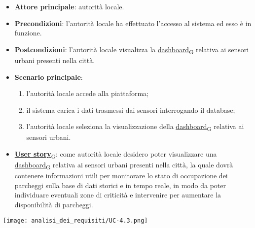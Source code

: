 \begin{itemize}
	\item \textbf{Attore principale}: autorità locale.
	\item \textbf{Precondizioni}: l'autorità locale ha effettuato l'accesso al sistema ed esso è in funzione.
	\item \textbf{Postcondizioni}: l'autorità locale visualizza la \href{https://7last.github.io/docs/pb/documentazione-interna/glossario\#dashboard}{dashboard\textsubscript{G}} relativa
	      ai sensori urbani presenti nella città.
	\item \textbf{Scenario principale}:
	      \begin{enumerate}
		      \item l'autorità locale accede alla piattaforma;
		      \item il sistema carica i dati trasmessi dai sensori interrogando il database;
		      \item l'autorità locale seleziona la visualizzazione della \href{https://7last.github.io/docs/pb/documentazione-interna/glossario\#dashboard}{dashboard\textsubscript{G}} relativa ai sensori urbani.
	      \end{enumerate}
	\item \href{https://7last.github.io/docs/pb/documentazione-interna/glossario\#user-story}{\textbf{User story}\textsubscript{G}}:
	      come autorità locale desidero poter visualizzare una \href{https://7last.github.io/docs/pb/documentazione-interna/glossario\#dashboard}{dashboard\textsubscript{G}} relativa ai sensori urbani presenti nella città, la quale
	      dovrà contenere informazioni utili per monitorare lo stato di occupazione dei parcheggi sulla base di dati storici e in tempo reale,
	      in modo da poter individuare eventuali zone di criticità e intervenire per aumentare la disponibilità di parcheggi.
\end{itemize}
\begin{center}
	\texttt{[image: analisi\_dei\_requisiti/UC-4.3.png]}
\end{center}


